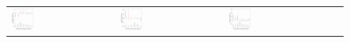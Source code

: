 \documentclass[12pt]{article}
\begin{document}
\begin{figure}[!ht]
\begin{minipage}{1\linewidth}
{\begin{tabular}{C{3.7cm}C{3.7cm}C{3.7cm}C{3.7cm}}
   \hspace{-2em}  \includegraphics[width = 0.22\textwidth]{figure/carryover/jiang_carryover.png} &
   \hspace{-2em}  \includegraphics[width = 0.22\textwidth]{figure/carryover/kilborn_carryover.png} &
     \hspace{-2em}  \includegraphics[width = 0.22\textwidth]{figure/carryover/paysonb_carryover.png}\\
\end{tabular}
}\\
\end{minipage}\vspace{-0.5em}
\addtocounter{figure}{-1}
\end{figure}
\clearpage
\end{document}
